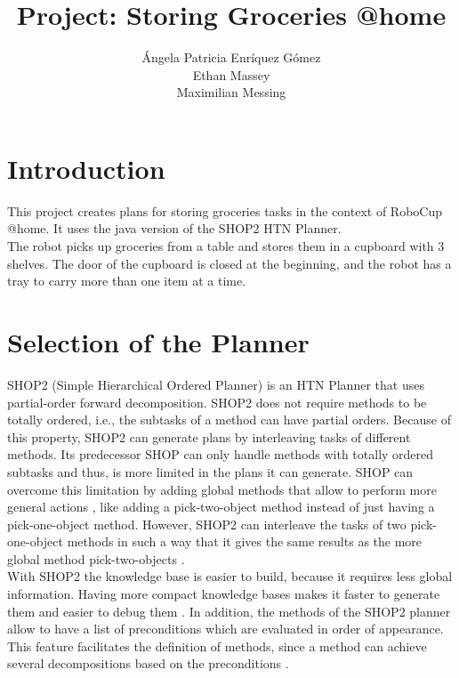 \documentclass[paper=a4, fontsize=11pt]{scrartcl}
\title{Project: Storing Groceries @home}
\author{\'{A}ngela Patricia Enr\'{i}quez G\'{o}mez \\
	Ethan Massey \\
	Maximilian Messing}
\begin{document}
	
	\maketitle 
	
 	\section{Introduction} 
 	
 	This project creates plans for storing groceries tasks in the context of RoboCup @home. It uses the java version of the SHOP2 HTN Planner. \\
 	
 	The robot picks up groceries from a table and stores them in a cupboard with 3 shelves. The door of the cupboard is closed at the beginning,
 	and the robot has a tray to carry more than one item at a time.
 	
 	\section{Selection of the Planner}
 
 	SHOP2 (Simple Hierarchical Ordered Planner) is an HTN Planner that uses partial-order forward decomposition. SHOP2 does not require methods to be totally ordered, i.e., the subtasks of a method can have partial orders. Because of this property, SHOP2 can generate plans by interleaving tasks of different methods. Its predecessor SHOP can only handle methods with totally ordered subtasks and thus, is more limited in the plans it can generate. SHOP can overcome this limitation by adding global methods that allow to perform more general actions \cite{Nau2001}, like adding a pick-two-object method instead of just having a pick-one-object method. However, SHOP2 can interleave the tasks of two pick-one-object methods in such a way that it gives the same results as the more global method pick-two-objects \cite{slides}. \\
 	
 	With SHOP2 the knowledge base is easier to build, because it requires less global information. Having more compact knowledge bases makes it faster to generate them and easier to debug them \cite{Nau2001}. In addition, the methods of the SHOP2 planner allow to have a list of preconditions which are evaluated in order of appearance. This feature facilitates the definition of methods, since a method can achieve several decompositions based on the preconditions \cite{Nau2003}. \\
 	
\end{document}
